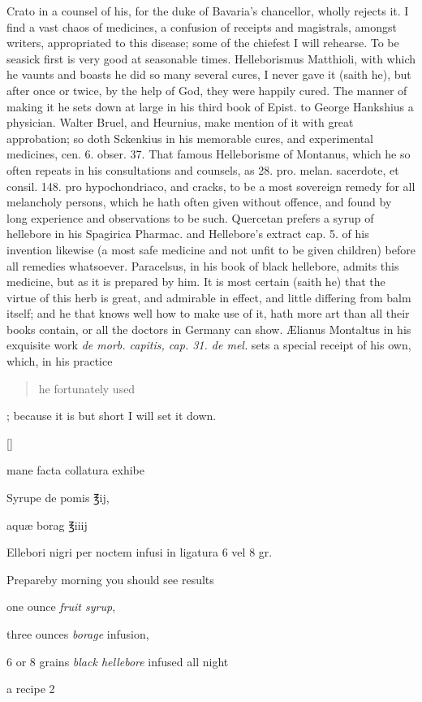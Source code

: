 Crato in a counsel of his, for the duke of Bavaria's chancellor, wholly
rejects it.
I find a vast chaos of medicines, a confusion of receipts and
magistrals, amongst writers, appropriated to this disease; some of the
chiefest I will rehearse. To be seasick first is very good at
seasonable times. Helleborismus Matthioli, with which he vaunts and
boasts he did so many several cures, I never gave it (saith he),
but after once or twice, by the help of God, they were happily cured.
The manner of making it he sets down at large in his third book of
Epist. to George Hankshius a physician. Walter Bruel, and Heurnius,
make mention of it with great approbation; so doth Sckenkius in his
memorable cures, and experimental medicines, cen. 6. obser. 37. That
famous Helleborisme of Montanus, which he so often repeats in his
consultations and counsels, as 28. pro. melan. sacerdote, et consil.
148. pro hypochondriaco, and cracks,  to be a most sovereign
remedy for all melancholy persons, which he hath often given without
offence, and found by long experience and observations to be such.
Quercetan prefers a syrup of hellebore in his Spagirica Pharmac. and
Hellebore's extract cap. 5. of his invention likewise (a most safe
medicine and not unfit to be given children) before all remedies
whatsoever. 
Paracelsus, in his book of black hellebore, admits this medicine, but
as it is prepared by him. It is most certain (saith he) that the
virtue of this herb is great, and admirable in effect, and little
differing from balm itself; and he that knows well how to make use of
it, hath more art than all their books contain, or all the doctors in
Germany can show.
\AE{}lianus Montaltus in his exquisite work \emph{de morb. capitis, cap. 31. de
mel.} sets a special receipt of his own, which, in his practice \blockquote{he
fortunately used}; because it is but short I will set it down.

\vspace{-\baselineskip}
\begin{Prescription}[H]
[\baselineskip]
\begin{prescriptionbox}{}{\textlatin{mane facta collatura exhibe}}
\item \textlatin{Syrupe de pomis} ℥ij,
\item \textlatin{aqu\ae{} borag ℥iiij}
\item \textlatin{Ellebori nigri per noctem infusi in ligatura 6 vel 8 gr.}
\end{prescriptionbox}
\begin{prescriptionbox}{Prepare}{by morning you should see results}
\item one ounce \emph{fruit syrup},
\item three ounces \emph{borage} infusion,
\item 6 or 8 grains \emph{black hellebore} infused all night
\end{prescriptionbox}
\caption{a recipe 2}
\end{Prescription}

